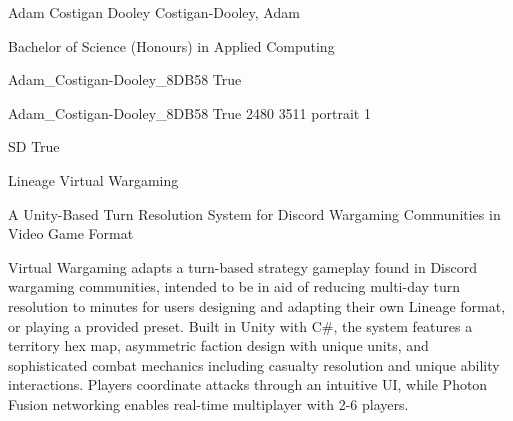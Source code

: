 
\begingroup{}\relax



\def\Key{Adam_Costigan-Dooley_8DB58}

{Adam Costigan Dooley}
{Costigan-Dooley, Adam}

{Bachelor of Science (Honours) in Applied Computing}

{Adam_Costigan-Dooley_8DB58}
{True}

{Adam_Costigan-Dooley_8DB58}
{True}
{2480}
{3511}
{portrait}
{1}

{SD}
{True}

{Lineage Virtual Wargaming}

{A Unity-Based Turn Resolution System for Discord Wargaming Communities in Video Game Format}

{Virtual Wargaming adapts a turn-based strategy gameplay found in Discord wargaming communities, intended to be in aid of reducing multi-day turn resolution to minutes for users designing and adapting their own Lineage format, or playing a provided preset. Built in Unity with C\#, the system features a territory hex map, asymmetric faction design with unique units, and sophisticated combat mechanics including casualty resolution and unique ability interactions. Players coordinate attacks through an intuitive UI, while Photon Fusion networking enables real-time multiplayer with 2-6 players.}

